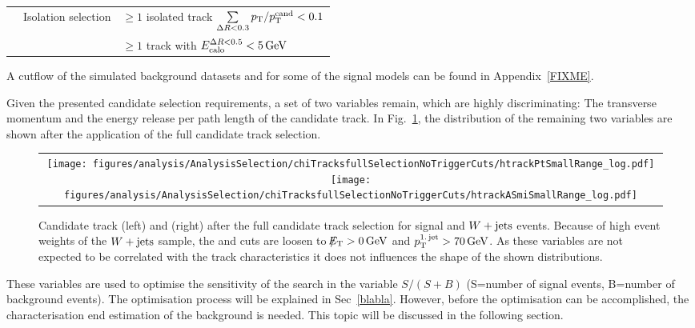 \begin{table}[!h]
{\begin{tabular}{l|l|l}
                                                              &  \multirow{2}{*}{Isolation selection}      & $\geq1$ isolated track $\sum \limits_{\Delta R < 0.3} p_{\text{T}}/p_{\text{T}}^{\text{cand}} < 0.1$ \\
                                                              &                                            & $\geq1$ track with $E^{\Delta R<0.5}_{\text{calo}}<5\,\text{Ge}\kern-0.06667em\text{V}$ \\


\bottomrule
\end{tabular}}
\end{table}  


A cutflow of the simulated background datasets and for some of the signal models can be found in Appendix~\ref{FIXME}.



Given the presented candidate selection requirements, a set of two variables remain, which are highly discriminating:
The transverse momentum and the energy release per path length of the candidate track.
In Fig.~\ref{fig:PtAndIasAfterFullPreselection}, the distribution of the remaining two variables are shown after the application of the full candidate track selection.
\begin{figure}[!tb]
  \centering 
  \begin{tabular}{c}
    \texttt{[image: figures/analysis/AnalysisSelection/chiTracksfullSelectionNoTriggerCuts/htrackPtSmallRange\_log.pdf]}
    \texttt{[image: figures/analysis/AnalysisSelection/chiTracksfullSelectionNoTriggerCuts/htrackASmiSmallRange\_log.pdf]}
  \end{tabular}
  \caption{Candidate track \pt (left) and \ias (right) after the full candidate track selection for signal and $W+\text{jets}$ events. 
           Because of high event weights of the $W+\text{jets}$ sample, the \met and \ptfirstjet cuts are loosen to \mbox{$\slash\mkern-12mu{E}_{\text{T}}>0\,\text{Ge}\kern-0.06667em\text{V}$} and \mbox{$p_{\text{T}}^{\text{1.\,jet}}>70\,\text{Ge}\kern-0.06667em\text{V}$}.
           As these variables are not expected to be correlated with the track characteristics it does not influences the shape of the shown distributions.}
  \label{fig:PtAndIasAfterFullPreselection}
\end{figure}
These variables are used to optimise the sensitivity of the search in the variable $S/(S+B)$ (S=number of signal events, B=number of background events).
The optimisation process will be explained in Sec~\ref{blabla}.
However, before the optimisation can be accomplished, the characterisation end estimation of the background is needed.
This topic will be discussed in the following section.

